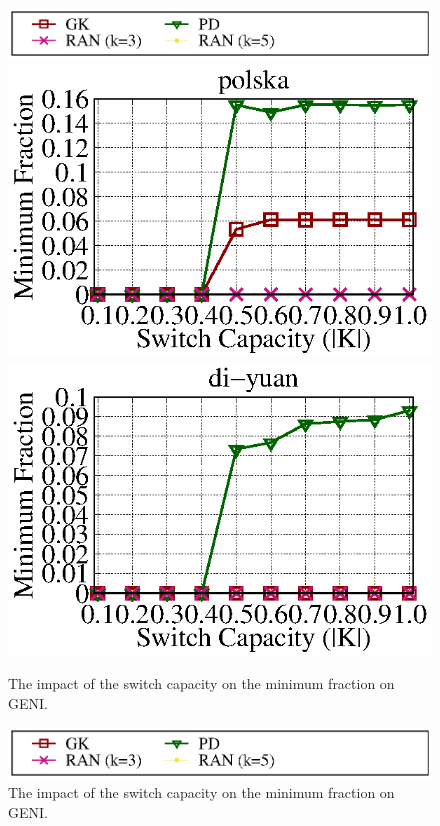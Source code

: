 \documentclass[a4paper,12pt]{report}
\begin{document}
\begin{large}
\begin{figure}[ht]
  \end{figure}
    \begin{figure}[ht]
    \caption{The impact of the switch capacity on the minimum fraction on GENI.}
	\centering
	  \includegraphics[width=1.0\textwidth]{lambda_legend.eps}
	  \includegraphics[width=1.0\textwidth]{polska_geni_lambda_e05.eps}
	  \includegraphics[width=1.0\textwidth]{di-yuan_geni_lambda_e05.eps}
  \end{figure}
  \begin{figure}[ht]
    \caption{The impact of the switch capacity on the minimum fraction on GENI.}
	\centering
	  \includegraphics[width=1.0\textwidth]{lambda_legend.eps}

\end{figure}
\end{large}
\end{document}
